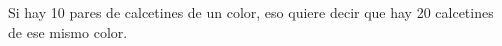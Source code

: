 Si hay 10 pares de calcetines de un color, eso quiere decir que hay 20 calcetines de ese mismo color.
